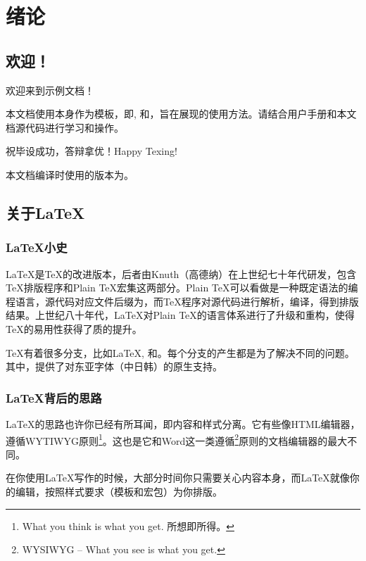 \chapter{绪论}
\section{欢迎！}
欢迎来到\cquthesis{}示例文档！

本文档使用\cquthesis{}本身作为模板，即, 和，旨在展现\cquthesis{}的使用方法。请结合\cquthesis{}用户手册和本文档源代码进行学习和操作。

祝毕设成功，答辩拿优！Happy Texing!

本文档编译时使用的\cquthesis{}版本为\version{}。

\section{关于\LaTeX{}}


\subsection{\LaTeX{}小史}
\LaTeX{}是\TeX{}的改进版本，后者由Knuth（高德纳）在上世纪七十年代研发，包含\TeX{}排版程序和Plain \TeX{}宏集这两部分。Plain \TeX{}可以看做是一种既定语法的编程语言，源代码对应文件后缀为，而\TeX{}程序对源代码进行解析，编译，得到排版结果。上世纪八十年代，\LaTeX{}对Plain \TeX{}的语言体系进行了升级和重构，使得\TeX{}的易用性获得了质的提升。

\TeX{}有着很多分支，比如\LaTeX{}, \LuaTeX{}和\XeTeX{}。每个分支的产生都是为了解决不同的问题。其中，\XeTeX{}提供了对东亚字体（中日韩）的原生支持。


\subsection{\LaTeX{}背后的思路}

\LaTeX{}的思路也许你已经有所耳闻，即{\heiti{}内容和样式分离。}它有些像HTML编辑器，遵循\textsf{WYTIWYG}原则\footnote{What you think is what you get. 所想即所得。}。这也是它和Word这一类遵循\footnote{\textsf{WYSIWYG} -- What you see is what you get.}原则的文档编辑器的最大不同。

在你使用\LaTeX{}写作的时候，大部分时间你只需要关心内容本身，而\LaTeX{}就像你的编辑，按照样式要求（模板和宏包）为你排版。


